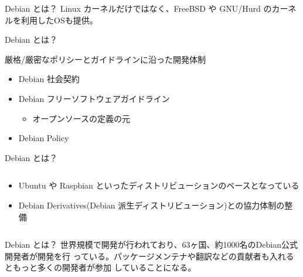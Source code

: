 \documentclass[cjk,c,squeeze,shrink,dvipdfmx,12pt]{beamer}
\begin{document}
\begin{frame}[fragile]{Debian とは？}
Linux カーネルだけではなく、FreeBSD や GNU/Hurd のカーネルを利用したOSも提供。

\centering
\end{frame}


\begin{frame}[fragile]{Debian とは？}

  厳格/厳密なポリシーとガイドラインに沿った開発体制
  \begin{itemize}
  \item Debian 社会契約
  \item Debian フリーソフトウェアガイドライン
    \begin{itemize}
    \item オープンソースの定義の元
    \end{itemize}
  \item Debian Policy
  \end{itemize}

\end{frame}

\begin{frame}[fragile]{Debian とは？}
  \begin{columns}
    \begin{column}{.58\paperwidth}
      \begin{itemize}
      \item
        Ubuntu や Raspbian といったディストリビューションのベースとなっている
      \item
        Debian Derivatives(Debian 派生ディストリビューション)との協力体制の整備
      \end{itemize}
    \end{column}
  \end{columns}
\end{frame}


\begin{frame}[fragile]{Debian とは？}
 世界規模で開発が行われており、63ヶ国、約1000名のDebian公式開発者が開発を行
 っている。パッケージメンテナや翻訳などの貢献者も入れるともっと多くの開発者が参加
 していることになる。

 \centering
\end{frame}
\end{document}
